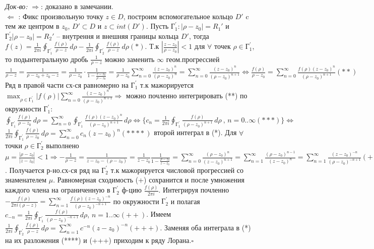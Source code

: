 \textit{Док-во:}
$\Longrightarrow$: доказано в замечании.\\
$\Longleftarrow$ : Фикс произвольную точку $z \in D$, построим вспомогательное кольцо $D'$ c тем же центром в $z_0$, $D' \subset D$ и $z \subset int(D')$. Пусть $\text{Г}_1^{'}: |\rho - z_0|=R_1'$ и $\text{Г}_2^{'}|\rho - z_0|=R_2'$ -- внутрення и внешняя границы кольца $D'$, тогда $f(z) = \frac{1}{2\pi i} \oint_{ \text{Г}_1^{'}} \frac{f(\rho)}{\rho - z} \,d\rho - \frac{1}{2\pi i} \oint_{ \text{Г}_2^{'}} \frac{f(\rho)}{\rho - z} \,d\rho(*)$. Т.к $|\frac{z-z_0}{\rho-z_0}|<1$ для $\forall$ точек $\rho \in \text{Г}_1^{'}$, то подынтегральную дробь $\frac{1}{\rho-z}$ можно заменить $\infty$ геом.прогрессией $\frac{1}{\rho-z} = \frac{1}{\rho-z_0+z_0-z}=\frac{1}{\rho-z_0}\cdot\frac{1}{1-\frac{z-z_0}{\rho-z_0}} = \frac{1}{\rho-z_0}\sum_{n=0}^{\infty}\frac{(z-z_0)^n}{(\rho-z_0)^n} = \sum_{n=0}^{\infty}\frac{(z-z_0)^n}{(\rho-z_0)^{n+1}} \Longleftrightarrow \frac{f(\rho)}{\rho-z_0}=\sum_{n=0}^{\infty}\frac{f(\rho)(z-z_0)^n}{(\rho-z_0)^{n+1}}(**)$ Ряд в правой части сх-ся равномерно на $\text{Г}_1^{'}$ т.к мажорируется $\max_{\rho \in \text{Г}_1^{'}}|f(\rho)|\sum_{n=0}^{\infty}\frac{(z-z_0)^n}{(\rho-z_0)^{n+1}} \Rightarrow$ можно почленно интегрировать (**) по окружности $\text{Г}_1^{'}$: $\oint_{ \text{Г}_1^{'}}\frac{f(\rho)}{\rho-z_0} \,d\rho =\sum_{n=0}^{\infty} \oint_{ \text{Г}_1^{'}} \frac{f(\rho)(z-z_0)^n}{(\rho-z_0)^{n+1}} \,d\rho \Longleftrightarrow \{ c_n = \frac{1}{2\pi i} \oint_{ \text{Г}_1^{'}} \frac{f(\rho)}{(\rho-z_0)^{n+1}} \,d\rho\ \text{, }n=0..\infty(***)\}\Longleftrightarrow$  $\frac{1}{2\pi i}\oint_{ \text{Г}_1^{'}}\frac{f(\rho)}{\rho-z_0} \,d\rho = \sum_{n=0}^{\infty}c_n(z-z_0)^n(****)$
\bigbreak
{} второй интеграл в (*). Для $\forall$ точки $\rho \in  \text{Г}_2^{'}$ выполнено $\mu=\frac{|\rho-z_0|}{|z-z_0|}<1 \Rightarrow -\frac{1}{\rho-z} = \frac{1}{z-z_0-(\rho-z_0)} = \frac{1}{z-z_0}\frac{1}{1-\frac{\rho-z_0}{z-z_0}}=\sum_{n=0}^{\infty}\frac{(\rho-z_0)^n}{(z-z_0)^{n+1}}=\sum_{n=1}^{\infty}\frac{(\rho-z_0)^{n-1}}{(z-z_0)^{n}}=
\sum_{n=1}^{\infty}\frac{(z-z_0)^{-n} }{(\rho-z_0)^{-n+1}}(+)$. Получается р-но.сх-ся ряд на $\text{Г}_2^{'}$ т.к мажорируется числовой прогрессией со знаменателем $\mu$. Равномерная сходимость (+) сохранится и после умножения каждого члена на ограниченную в $\text{Г}_2^{'}$ ф-цию $\frac{f(\rho)}{2\pi i}$. Интегрируя почленно $-\frac{f(\rho)}{2\pi i(\rho-z)}=\sum_{n=1}^{\infty}\frac{f(\rho)(z-z_0)^{-n} }{(\rho-z_0)^{-n+1}}$ по окружности $\text{Г}_2^{'}$ и полагая $c_{-n} = \frac{1}{2\pi i} \oint_{ \text{Г}_1^{'}} \frac{f(\rho)}{(\rho-z_0)^{-n+1}} \,d\rho \text{, }n=1..\infty (++)$. Имеем $\frac{1}{2\pi i} \oint_{ \text{Г}_2^{'}} \frac{f(\rho)}{\rho-z} \,d\rho = \sum_{n=1}^{\infty} c^{-n}(z-z_0)^{-n}(+++)$. Заменяя оба интеграла в (*) на их разложения (****) и (+++) приходим к ряду Лорана.$\square$
